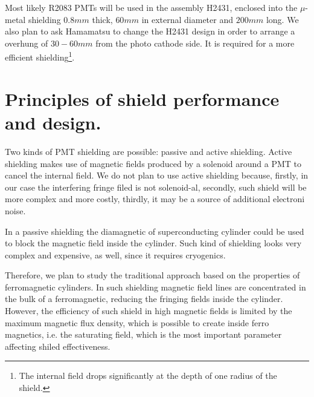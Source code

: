\documentclass[12pt]{article}
\begin{document}
Most likely  R2083 PMTs will be used in the assembly H2431, enclosed into
the $\mu$-metal shielding $0.8mm$ thick, $60mm$ in external diameter and $200mm$ long.
We also  plan to ask Hamamatsu to change the  H2431 design  in order to arrange a
overhung of $30-60mm$ from  the photo cathode side.
It is required for a  more efficient shielding\footnote{The internal field 
drops significantly at the depth of one radius of the shield.}.


\section{ Principles of shield performance and design.}


Two   kinds of PMT shielding are possible: passive and active shielding.
Active shielding makes use of  magnetic fields produced by a  solenoid  around a PMT to cancel the
internal  field. We do not plan to use active shielding
 because, firstly,  in our case the  interfering  fringe  filed
is  not solenoid-al, secondly,  such shield  will be  more complex and more costly, thirdly, it may be a source of
additional electroni noise.

In a passive shielding  the diamagnetic
of superconducting cylinder could be   used to block the magnetic field  inside the cylinder.
Such  kind of shielding looks very complex and expensive, as well, since it requires cryogenics.

Therefore, we plan to study the  traditional approach  based on the  properties of
 ferromagnetic cylinders.
In such shielding magnetic field lines are concentrated in the bulk of a
ferromagnetic, reducing the fringing fields inside the cylinder.
 However, the efficiency  of such shield in high magnetic fields is limited by the
 maximum magnetic flux density, which is possible to create inside  ferro magnetics, i.e. the saturating field,
which is the most important parameter affecting shiled effectiveness.


%
%


\end{document}
